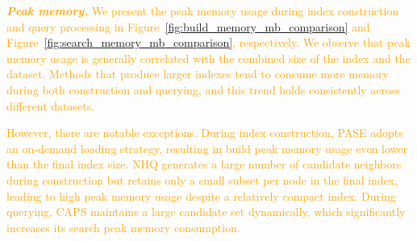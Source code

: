 \documentclass[sigconf, nonacm]{acmart}
\begin{document}
{%
%
%
\textcolor{orange}{\textit{\textbf{Peak memory.}}	
We present the peak memory usage during index construction and query processing in Figure~\ref{fig:build_memory_mb_comparison} and Figure~\ref{fig:search_memory_mb_comparison}, respectively. We observe that peak memory usage is generally correlated with the combined size of the index and the dataset. Methods that produce larger indexes tend to consume more memory during both construction and querying, and this trend holds consistently across different datasets.}

\textcolor{orange}{However, there are notable exceptions. During index construction, PASE adopts an on-demand loading strategy, resulting in build peak memory usage even lower than the final index size. NHQ generates a large number of candidate neighbors during construction but retains only a small subset per node in the final index, leading to high peak memory usage despite a relatively compact index.
During querying, CAPS maintains a large candidate set dynamically, which significantly increases its search peak memory consumption.}

}
\end{document}
